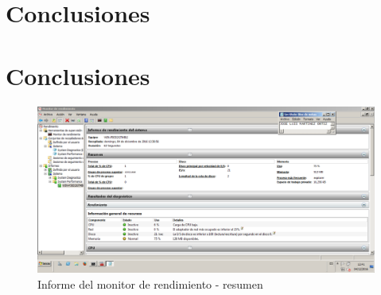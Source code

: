 \section{Conclusiones}

\section{Conclusiones} %

\begin{figure}[H] %
\centering
\includegraphics[scale=0.4]{./imagenes/P3_4_1.png} 
\caption{Informe del monitor de rendimiento - resumen} \label{fig:P3_4_1}
\end{figure}











